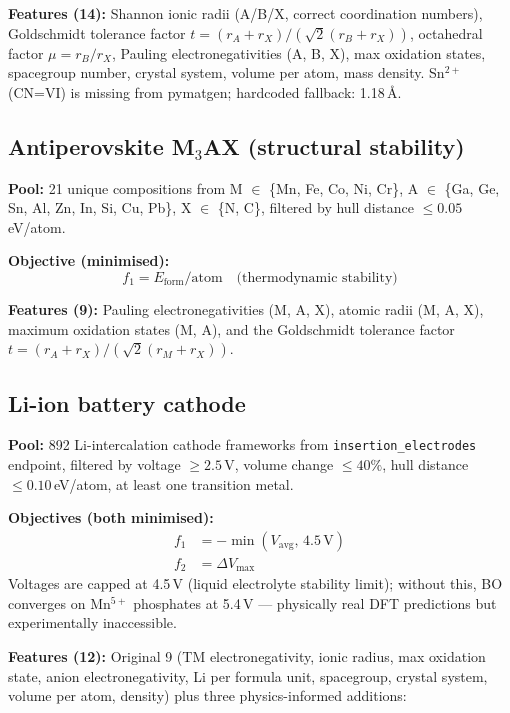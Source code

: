 \documentclass[10pt,twocolumn]{article}
\begin{document}
\textbf{Features (14):}
Shannon ionic radii (A/B/X, correct coordination numbers),
Goldschmidt tolerance factor $t = (r_A + r_X)/(\sqrt{2}(r_B + r_X))$,
octahedral factor $\mu = r_B/r_X$, Pauling electronegativities (A, B, X),
max oxidation states, spacegroup number, crystal system, volume per atom,
mass density.
Sn$^{2+}$ (CN=VI) is missing from pymatgen; hardcoded fallback: 1.18\,\AA.

\subsection{Antiperovskite M$_3$AX (structural stability)}

\textbf{Pool:} 21 unique compositions from M $\in$ \{Mn, Fe, Co, Ni, Cr\},
A $\in$ \{Ga, Ge, Sn, Al, Zn, In, Si, Cu, Pb\}, X $\in$ \{N, C\}, filtered
by hull distance $\leq 0.05$\,eV/atom.

\textbf{Objective (minimised):}
\begin{equation}
  f_1 = E_\text{form}/\text{atom} \quad \text{(thermodynamic stability)}
\end{equation}

\textbf{Features (9):}
Pauling electronegativities (M, A, X), atomic radii (M, A, X),
maximum oxidation states (M, A), and the Goldschmidt tolerance factor
$t = (r_A + r_X)/(\sqrt{2}(r_M + r_X))$.

\subsection{Li-ion battery cathode}

\textbf{Pool:} 892 Li-intercalation cathode frameworks from
\texttt{insertion\_electrodes} endpoint, filtered by voltage $\geq 2.5$\,V,
volume change $\leq 40\%$, hull distance $\leq 0.10$\,eV/atom, at least one
transition metal.

\textbf{Objectives (both minimised):}
\begin{align}
  f_1 &= -\min(V_\text{avg},\, 4.5\,\text{V}) \\
  f_2 &= \Delta V_\text{max}
\end{align}
Voltages are capped at 4.5\,V (liquid electrolyte stability limit); without
this, BO converges on Mn$^{5+}$ phosphates at 5.4\,V --- physically real
DFT predictions but experimentally inaccessible.

\textbf{Features (12):}
Original 9 (TM electronegativity, ionic radius, max oxidation state, anion
electronegativity, Li per formula unit, spacegroup, crystal system, volume per
atom, density) plus three physics-informed additions:
\end{document}
